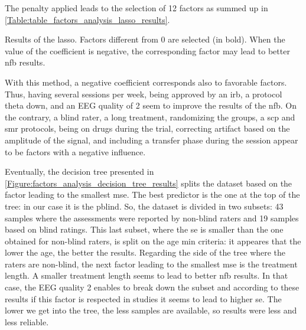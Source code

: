 The penalty applied leads to the selection of 12 factors as summed up in \cref{Table:table_factors_analysis_lasso_results}.
\begin{table}[h!]
  \centering
  \caption{Results of the \gls{lasso}. Factors different from 0 are selected (in bold). When the value of the coefficient is negative, the corresponding 
	factor may lead to better \gls{nfb} results.}
  
  \label{Table:table_factors_analysis_lasso_results}
\end{table}

With this method, a negative coefficient corresponds also to favorable factors. Thus, having several sessions per week, being approved 
by an \gls{irb}, a protocol theta down, and an EEG quality of 2 seem to improve the results of the \gls{nfb}. 
On the contrary, a blind rater, a long treatment, randomizing the groups, a \gls{scp} and \gls{smr} protocols, being on drugs during the trial, correcting 
artifact based on the amplitude of the signal, and including a transfer phase during the session appear to be factors with a negative influence.

Eventually, the decision tree presented in \cref{Figure:factors_analysis_decision_tree_results} splits the dataset based on the factor leading to the
 smallest \gls{mse}. The best predictor is the one at the top of the tree: in our case it is the \gls{pblind}. So, the dataset is divided in two subsets: 
43 samples where the assessments were reported by non-blind raters and 19 samples based on blind ratings. This last subset, where the \gls{se} is smaller 
than the one obtained for non-blind raters, is split on the age min criteria: it appeares that the lower the age, the better the results. Regarding 
the side of the tree where the raters are non-blind, the next factor leading to the smallest \gls{mse} is the treatment length. A smaller treatment
 length seems to lead to better \gls{nfb} results. In that case, the EEG quality 2 enables to break down the subset and according to these results
 if this factor is respected in studies it seems to lead to higher \gls{se}. The lower we get into the tree, the less samples are available, so results 
were less and less reliable.

